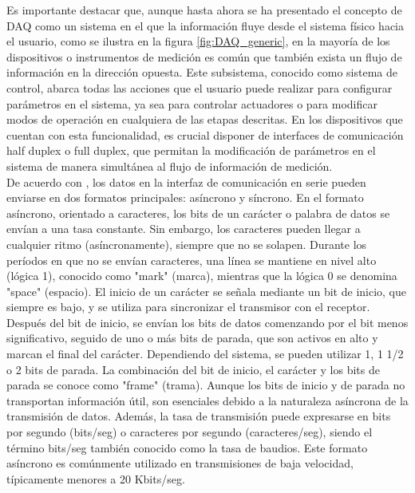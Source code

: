 \documentclass[]{book}
\begin{document}
 \noindent Es importante destacar que, aunque hasta ahora se ha presentado el concepto de DAQ como un sistema en el que la información fluye desde el sistema físico hacia el usuario, como se ilustra en la figura \ref{fig:DAQ_generic}, en la mayoría de los dispositivos o instrumentos de medición es común que también exista un flujo de información en la dirección opuesta. Este subsistema, conocido como sistema de control, abarca todas las acciones que el usuario puede realizar para configurar parámetros en el sistema, ya sea para controlar actuadores o para modificar modos de operación en cualquiera de las etapas descritas. En los dispositivos que cuentan con esta funcionalidad, es crucial disponer de interfaces de comunicación half duplex o full duplex, que permitan la modificación de parámetros en el sistema de manera simultánea al flujo de información de medición.\\

 \noindent De acuerdo con \cite{eeeguide_serial_communication_8251}, los datos en la interfaz de comunicación en serie pueden enviarse en dos formatos principales: asíncrono y síncrono. En el formato asíncrono, orientado a caracteres, los bits de un carácter o palabra de datos se envían a una tasa constante. Sin embargo, los caracteres pueden llegar a cualquier ritmo (asíncronamente), siempre que no se solapen. Durante los períodos en que no se envían caracteres, una línea se mantiene en nivel alto (lógica 1), conocido como "mark" (marca), mientras que la lógica 0 se denomina "space" (espacio). El inicio de un carácter se señala mediante un bit de inicio, que siempre es bajo, y se utiliza para sincronizar el transmisor con el receptor. Después del bit de inicio, se envían los bits de datos comenzando por el bit menos significativo, seguido de uno o más bits de parada, que son activos en alto y marcan el final del carácter. Dependiendo del sistema, se pueden utilizar 1, 1 1/2 o 2 bits de parada. La combinación del bit de inicio, el carácter y los bits de parada se conoce como "frame" (trama). Aunque los bits de inicio y de parada no transportan información útil, son esenciales debido a la naturaleza asíncrona de la transmisión de datos. Además, la tasa de transmisión puede expresarse en bits por segundo (bits/seg) o caracteres por segundo (caracteres/seg), siendo el término bits/seg también conocido como la tasa de baudios. Este formato asíncrono es comúnmente utilizado en transmisiones de baja velocidad, típicamente menores a 20 Kbits/seg.\\
\end{document}
